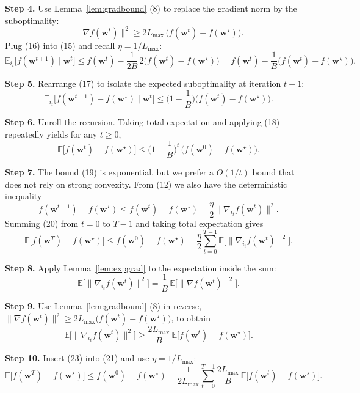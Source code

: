 \documentclass{article}
\newcommand{\E}{\mathbb{E}}
\begin{document}
\noindent\textbf{Step 4.}  Use Lemma~\ref{lem:gradbound} (8) to replace the gradient norm
by the suboptimality:
\[
\|\nabla f(\bm w^{t})\|^{2}
\ge 2L_{\max}\,\big(f(\bm w^{t})-f(\bm w^{\star})\big).
\tag{16}
\]
Plug (16) into (15) and recall $\eta=1/L_{\max}$:
\[
\E_{i_t}\!\big[f(\bm w^{t+1})\mid \bm w^{t}\big]
\le f(\bm w^{t})-\frac{1}{2B}\,
2\big(f(\bm w^{t})-f(\bm w^{\star})\big)
= f(\bm w^{t})-\frac{1}{B}\big(f(\bm w^{t})-f(\bm w^{\star})\big).
\tag{17}
\]

\noindent\textbf{Step 5.}  Rearrange (17) to isolate the expected suboptimality at
iteration $t+1$:
\[
\E_{i_t}\!\big[f(\bm w^{t+1})-f(\bm w^{\star})\mid \bm w^{t}\big]
\le \Big(1-\frac{1}{B}\Big)\big(f(\bm w^{t})-f(\bm w^{\star})\big).
\tag{18}
\]

\noindent\textbf{Step 6.}  Unroll the recursion.  Taking total expectation and
applying (18) repeatedly yields for any $t\ge 0$,
\[
\E\!\big[f(\bm w^{t})-f(\bm w^{\star})\big]
\le \Big(1-\frac{1}{B}\Big)^{t}\,
\big(f(\bm w^{0})-f(\bm w^{\star})\big).
\tag{19}
\]

\noindent\textbf{Step 7.}  The bound (19) is exponential, but we prefer a
$O(1/t)$ bound that does not rely on strong convexity.  From (12) we also have
the deterministic inequality
\[
f(\bm w^{t+1})-f(\bm w^{\star})
\le f(\bm w^{t})-f(\bm w^{\star})
-\frac{\eta}{2}\|\nabla_{i_t}f(\bm w^{t})\|^{2}.
\tag{20}
\]
Summing (20) from $t=0$ to $T-1$ and taking total expectation gives
\[
\E\!\big[f(\bm w^{T})-f(\bm w^{\star})\big]
\le f(\bm w^{0})-f(\bm w^{\star})
-\frac{\eta}{2}\sum_{t=0}^{T-1}
\E\!\big[\|\nabla_{i_t}f(\bm w^{t})\|^{2}\big].
\tag{21}
\]

\noindent\textbf{Step 8.}  Apply Lemma~\ref{lem:expgrad} to the expectation inside the
sum:
\[
\E\!\big[\|\nabla_{i_t}f(\bm w^{t})\|^{2}\big]
=\frac{1}{B}\,\E\!\big[\|\nabla f(\bm w^{t})\|^{2}\big].
\tag{22}
\]

\noindent\textbf{Step 9.}  Use Lemma~\ref{lem:gradbound} (8) in reverse,
$\|\nabla f(\bm w^{t})\|^{2}\ge 2L_{\max}\big(f(\bm w^{t})-f(\bm w^{\star})\big)$,
to obtain
\[
\E\!\big[\|\nabla_{i_t}f(\bm w^{t})\|^{2}\big]
\ge \frac{2L_{\max}}{B}\,
\E\!\big[f(\bm w^{t})-f(\bm w^{\star})\big].
\tag{23}
\]

\noindent\textbf{Step 10.}  Insert (23) into (21) and use $\eta=1/L_{\max}$:
\[
\E\!\big[f(\bm w^{T})-f(\bm w^{\star})\big]
\le f(\bm w^{0})-f(\bm w^{\star})
-\frac{1}{2L_{\max}}\sum_{t=0}^{T-1}
\frac{2L_{\max}}{B}\,
\E\!\big[f(\bm w^{t})-f(\bm w^{\star})\big].
\tag{24}
\]
\end{document}

